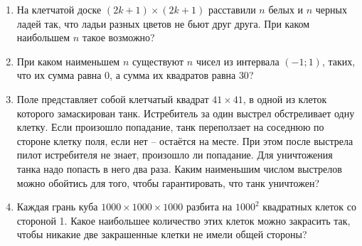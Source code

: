 \documentclass{article}
\begin{document}
\begin{enumerate}[label*=\protect\fbox{\arabic{enumi}}]
\item На клетчатой доске $(2k + 1) \times (2k + 1)$ расставили $n$ белых и $n$
черных ладей так, что ладьи разных цветов не бьют друг друга. При каком наибольшем $n$ такое возможно?

\item При каком наименьшем $n$ существуют $n$ чисел из интервала
$(-1; 1)$, таких, что их сумма равна 0, а сумма их квадратов равна $30$?

\item Поле представляет собой клетчатый квадрат $41 \times 41$, в одной из клеток которого замаскирован танк. Истребитель за один выстрел обстреливает одну клетку. Если произошло попадание, танк переползает на соседнюю по стороне клетку поля, если нет – остаётся на месте. При этом после выстрела пилот истребителя не знает, произошло ли попадание. Для уничтожения танка надо попасть в него два раза. Каким наименьшим числом выстрелов можно обойтись для того, чтобы гарантировать, что танк уничтожен? 

\item Каждая грань куба $1000 \times 1000 \times 1000$ разбита на $1000^2$ квадратных клеток со стороной 1. Какое наибольшее количество этих клеток можно закрасить так, чтобы никакие две закрашенные клетки не имели общей стороны?

\end{enumerate}
\end{document}
